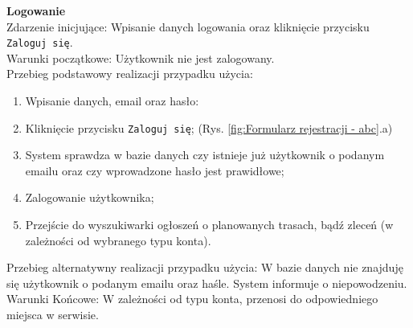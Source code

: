 \textbf{Logowanie} \\
Zdarzenie inicjujące: Wpisanie danych logowania oraz kliknięcie przycisku \texttt{Zaloguj się}. \\
Warunki początkowe: Użytkownik nie jest zalogowany. \\
Przebieg podstawowy realizacji przypadku użycia:
\begin{enumerate}
    \item Wpisanie danych, email oraz hasło:
    \item Kliknięcie przycisku \texttt{Zaloguj się}; (Rys. \ref{fig:Formularz rejestracji - abc}.a)
    \item System sprawdza w bazie danych czy istnieje już użytkownik o podanym emailu oraz czy wprowadzone hasło jest prawidłowe;
    \item Zalogowanie użytkownika;
    \item Przejście do wyszukiwarki ogłoszeń o planowanych trasach, bądź zleceń (w zależności od wybranego typu konta).
\end{enumerate}
Przebieg alternatywny realizacji przypadku użycia: W bazie danych nie znajduję się użytkownik o podanym emailu oraz haśle. System informuje o niepowodzeniu. \\
Warunki Końcowe: W zależności od typu konta, przenosi do odpowiedniego miejsca w serwisie.\\

